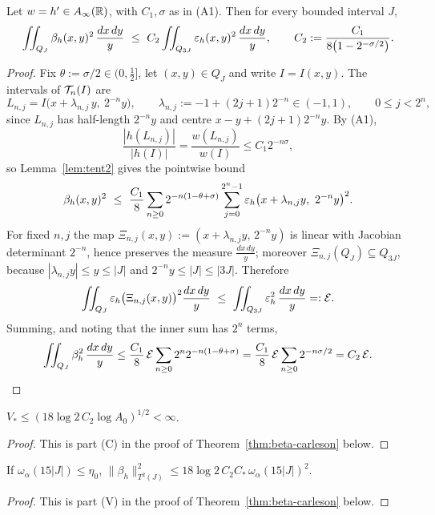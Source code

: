 \begin{theorem}[Comparison]\label{thm:compare}
	\leanok
	Let $w=h'\in A_\infty(\mathbb{R})$, with $C_1,\sigma$ as in {\rm(A1)}. Then for every
	bounded interval $J$,
	\[
	\iint_{Q_J}\beta_h(x,y)^2\,\frac{dx\,dy}{y}
	\ \le\ C_2\iint_{Q_{3J}}\varepsilon_h(x,y)^2\,\frac{dx\,dy}{y},
	\qquad
	C_2:=\frac{C_1}{8\bigl(1-2^{-\sigma/2}\bigr)} .
	\]
\end{theorem}

\begin{proof}
	Fix $\theta:=\sigma/2\in(0,\tfrac12]$, let $(x,y)\in Q_J$ and write
	$I=I(x,y)$. The intervals of $\mathcal{T}_n(I)$ are
	\[
	L_{n,j}=I\bigl(x+\lambda_{n,j}\,y,\ 2^{-n}y\bigr),\qquad
	\lambda_{n,j}:=-1+(2j+1)2^{-n}\in(-1,1),\qquad 0\le j<2^{n},
	\]
	since $L_{n,j}$ has half-length $2^{-n}y$ and centre $x-y+(2j+1)2^{-n}y$. By
	(A1),
	\[
	\frac{|h(L_{n,j})|}{|h(I)|}=\frac{w(L_{n,j})}{w(I)}\le C_1 2^{-n\sigma},
	\]
	so Lemma~\ref{lem:tent2} gives the pointwise bound
	\[
	\beta_h(x,y)^2\ \le\ \frac{C_1}{8}\sum_{n\ge0}2^{-n(1-\theta+\sigma)}
	\sum_{j=0}^{2^{n}-1}\eps_h\bigl(x+\lambda_{n,j}y,\ 2^{-n}y\bigr)^2 .
	\]
	For fixed $n,j$ the map $\Xi_{n,j}(x,y):=(x+\lambda_{n,j}y,\,2^{-n}y)$ is
	linear with Jacobian determinant $2^{-n}$, hence preserves the measure
	$\frac{dx\,dy}{y}$; moreover $\Xi_{n,j}(Q_J)\subseteq Q_{3J}$, because
	$|\lambda_{n,j}y|\le y\le|J|$ and $2^{-n}y\le|J|\le|3J|$. Therefore
	\[
	\iint_{Q_J}\varepsilon_h\bigl(\Xi_{n,j}(x,y)\bigr)^2\frac{dx\,dy}{y}
	\ \le\ \iint_{Q_{3J}}\varepsilon_h^2\,\frac{dx\,dy}{y}=:\mathcal E .
	\]
	Summing, and noting that the inner sum has $2^n$ terms,
	\[
	\iint_{Q_J}\beta_h^2\,\frac{dx\,dy}{y}
	\le\frac{C_1}{8}\,\mathcal E\sum_{n\ge0}2^{n}2^{-n(1-\theta+\sigma)}
	=\frac{C_1}{8}\,\mathcal E\sum_{n\ge0}2^{-n\sigma/2}=C_2\,\mathcal E . \qedhere
	\]
\end{proof}

\begin{lemma}\label{lem:beta_carleson_uniform_bound}
	$V_*\le(18\log2\,C_2\log A_0)^{1/2}<\infty$.
\end{lemma}
\begin{proof}
	This is part (C) in the proof of Theorem~\ref{thm:beta-carleson} below.
\end{proof}

\begin{lemma}\label{lem:beta_carleson_vanishing_bound}
	If $\omega_\alpha(15|J|)\le\eta_0$, $\|\beta_h\|_{T^2(J)}^2\le18\log2\,C_2C_*\,\omega_\alpha(15|J|)^2$.
\end{lemma}
\begin{proof}
	This is part (V) in the proof of Theorem~\ref{thm:beta-carleson} below.
\end{proof}


